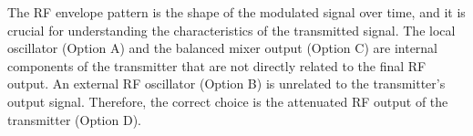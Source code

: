 The RF envelope pattern is the shape of the modulated signal over time, and it is crucial for understanding the characteristics of the transmitted signal. The local oscillator (Option A) and the balanced mixer output (Option C) are internal components of the transmitter that are not directly related to the final RF output. An external RF oscillator (Option B) is unrelated to the transmitter’s output signal. Therefore, the correct choice is the attenuated RF output of the transmitter (Option D).

